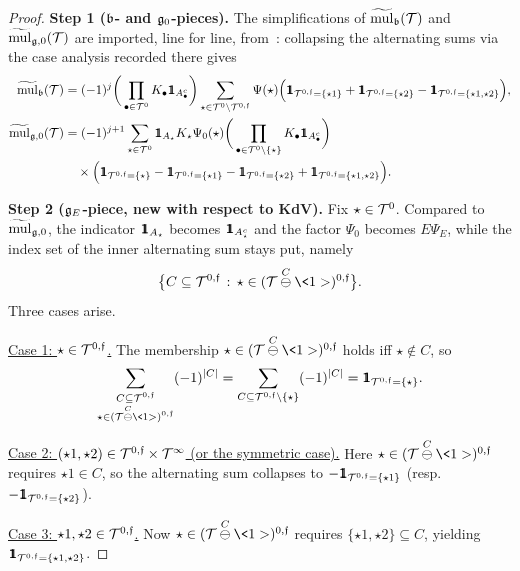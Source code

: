 \begin{proof}
\noindent\textbf{Step 1 ($\mathfrak{b}$- and $\mathfrak{g}_0$-pieces).}
The simplifications of $\widetilde{\operatorname{mul}}_{\mathfrak{b}}(\mathcal{T})$ and $\widetilde{\operatorname{mul}}_{\mathfrak{g},0}(\mathcal{T})$ are imported, line for line, from~\cite[Lemma~2.10, Steps~1--2]{chcora}: collapsing the alternating sums via the case analysis recorded there gives
\begin{align}
\label{eq:mulb-nv}
\wt{\mul}_{\bfrak}(\TT) &=(-1)^j \bigg(\prod_{\bul\in \TT^0}K_\bul\ind_{A_\bul^c}\bigg) \sum_{\star\in \TT^0\setminus \TT^{0,\ff}} \Psi(\star)
\Big( \ind_{\TT^{0,\ff}=\{\star1\}} + \ind_{\TT^{0,\ff}=\{\star2\}} - \ind_{\TT^{0,\ff}=\{\star1,\star2\}}\Big),\\
\label{eq:mulg0-nv}
\wt{\mul}_{\gfrak,0}(\TT)
&= (-1)^{j+1} \sum_{\star\in \TT^0} \ind_{A_\star}K_\star\Psi_0(\star) \bigg(\prod_{\bul\in \TT^0\setminus\{\star\}}K_\bul\ind_{A_\bul^c}\bigg) \nonumber\\
&\quad \times\Big( \ind_{\TT^{0,\ff}=\{\star\}} - \ind_{\TT^{0,\ff}=\{\star1\}} - \ind_{\TT^{0,\ff}=\{\star2\}} + \ind_{\TT^{0,\ff}=\{\star1,\star2\}}\Big).
\end{align}

\medskip

\noindent\textbf{Step 2 ($\mathfrak{g}_E$-piece, new with respect to KdV).}
Fix $\star\in \mathcal{T}^0$. Compared to $\widetilde{\operatorname{mul}}_{\mathfrak{g},0}$, the indicator $\ind_{A_\star}$ becomes $\ind_{A_\star^c}$ and the factor $\Psi_0$ becomes $E\Psi_E$, while the index set of the inner alternating sum stays put, namely
\[
\big\{ C \subseteq \TT^{0,\ff} \, : \, \star \in (\TT\overset{C}{\ominus}\<1>)^{0,\ff} \big\}.
\]
Three cases arise.

\noindent\underline{Case 1: $\star\in\mathcal{T}^{0,\mathfrak{f}}$.} The membership $\star\in (\TT\overset{C}{\ominus}\<1>)^{0,\ff}$ holds iff $\star\notin C$, so
\[
\sum_{\substack{C\subseteq \TT^{0,\ff} \\ \star\in (\TT\overset{C}{\ominus}\<1>)^{0,\ff}}} (-1)^{|C|}
= \sum_{C\subseteq \TT^{0,\ff}\setminus\{\star\}} (-1)^{|C|}
= \ind_{\TT^{0,\ff}=\{\star\}}.
\]

\noindent\underline{Case 2: $(\star1,\star2)\in\mathcal{T}^{0,\mathfrak{f}}\times\mathcal{T}^\infty$ (or the symmetric case).} Here $\star\in(\TT\overset{C}{\ominus}\<1>)^{0,\ff}$ requires $\star1\in C$, so the alternating sum collapses to $-\ind_{\TT^{0,\ff}=\{\star1\}}$ (resp.\ $-\ind_{\TT^{0,\ff}=\{\star2\}}$).

\noindent\underline{Case 3: $\star1,\star2\in\mathcal{T}^{0,\mathfrak{f}}$.} Now $\star\in(\TT\overset{C}{\ominus}\<1>)^{0,\ff}$ requires $\{\star1,\star2\}\subseteq C$, yielding $\ind_{\TT^{0,\ff}=\{\star1,\star2\}}$.


\end{proof}
